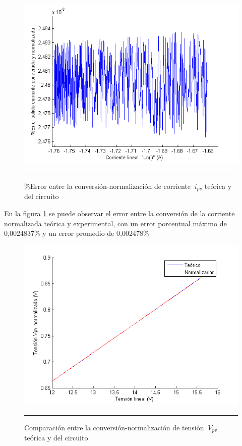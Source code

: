   \begin{figure}[H]
  \centering
    \includegraphics[scale=0.7]{./ERROR_CONV_NORM_I.png}
    \rule{35em}{0.5pt}
  \caption[\%Error entre la conversión-normalización de corriente $\ i_{pv}$ teórica y del circuito]{\%Error entre la conversión-normalización de corriente $\ i_{pv}$ teórica y del circuito}
  \label{fig:ENORMI}
\end{figure}

En la figura \ref{fig:ENORMI} se puede observar el error entre la conversión de la corriente normalizada teórica y experimental, con un error porcentual máximo de 0,0024837\% y un error promedio de 0,002478\% 


  \begin{figure}[H]
  \centering
    \includegraphics[scale=0.7]{./Normalizador_V.png}
    \rule{35em}{0.5pt}
  \caption[Comparación entre la conversión-normalización de tensión $\ V_{pv}$ teórica y del circuito]{Comparación entre la conversión-normalización de tensión  $\ V_{pv}$ teórica y del circuito}
  \label{fig:NORMV}
\end{figure}


